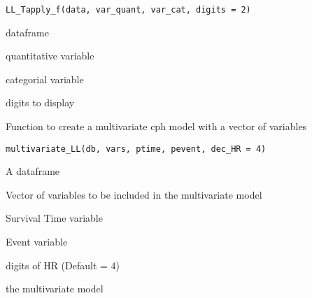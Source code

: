 \documentclass[a4paper]{book}
\begin{document}
%
\begin{Usage}
\begin{verbatim}
LL_Tapply_f(data, var_quant, var_cat, digits = 2)
\end{verbatim}
\end{Usage}
%
\begin{Arguments}
\begin{ldescription}
\item[\code{data}] dataframe

\item[\code{var\_quant}] quantitative variable

\item[\code{var\_cat}] categorial variable

\item[\code{digits}] digits to display
\end{ldescription}
\end{Arguments}
%
\begin{Description}
Function to create a multivariate cph model with a vector of variables
\end{Description}
%
\begin{Usage}
\begin{verbatim}
multivariate_LL(db, vars, ptime, pevent, dec_HR = 4)
\end{verbatim}
\end{Usage}
%
\begin{Arguments}
\begin{ldescription}
\item[\code{db}] A dataframe

\item[\code{vars}] Vector of variables to be included in the multivariate model

\item[\code{ptime}] Survival Time variable

\item[\code{pevent}] Event variable

\item[\code{dec\_HR}] digits of HR (Default = 4)
\end{ldescription}
\end{Arguments}
%
\begin{Value}
the multivariate model
\end{Value}
\end{document}

